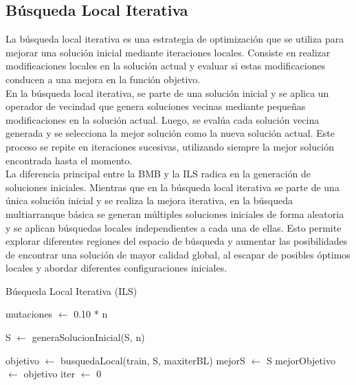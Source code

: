 \newpage

\subsection{Búsqueda Local Iterativa}
La búsqueda local iterativa es una estrategia de optimización que se utiliza para mejorar una solución inicial mediante iteraciones locales. Consiste en realizar modificaciones locales en la solución actual y evaluar si estas modificaciones conducen a una mejora en la función objetivo.\\

En la búsqueda local iterativa, se parte de una solución inicial y se aplica un operador de vecindad que genera soluciones vecinas mediante pequeñas modificaciones en la solución actual. Luego, se evalúa cada solución vecina generada y se selecciona la mejor solución como la nueva solución actual. Este proceso se repite en iteraciones sucesivas, utilizando siempre la mejor solución encontrada hasta el momento.\\

La diferencia principal entre la BMB y la ILS radica en la generación de soluciones iniciales. Mientras que en la búsqueda local iterativa se parte de una única solución inicial y se realiza la mejora iterativa, en la búsqueda multiarranque básica se generan múltiples soluciones iniciales de forma aleatoria y se aplican búsquedas locales independientes a cada una de ellas. Esto permite explorar diferentes regiones del espacio de búsqueda y aumentar las posibilidades de encontrar una solución de mayor calidad global, al escapar de posibles óptimos locales y abordar diferentes configuraciones iniciales.\\

\begin{algorithm}[H]
	\caption{Búsqueda Local Iterativa (ILS)}
	

	mutaciones $\leftarrow$ 0.10 * n\;
	
	S $\leftarrow$ generaSolucionInicial(S, n)
	
	objetivo $\leftarrow$ busquedaLocal(train, S, maxiterBL)\;
	mejorS $\leftarrow$ S\;
	mejorObjetivo $\leftarrow$ objetivo\;
	\BlankLine
	iter $\leftarrow$ 0\;
	
	\;
\end{algorithm}

